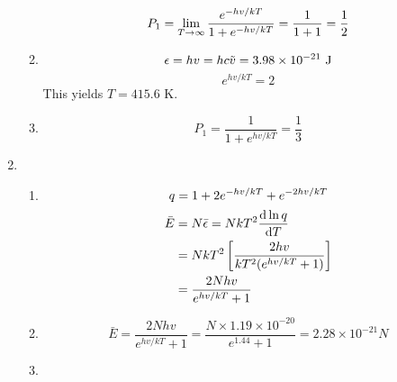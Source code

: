 \begin{solution}
\begin{enumerate}
\begin{enumerate}
                        \begin{equation*}
                            P_1=\lim_{T\to\infty}\frac{e^{-hv/kT}}{1+e^{-hv/kT}}=\frac{1}{1+1}=\frac{1}{2}
                        \end{equation*}
                  \item \begin{equation*}
                            \epsilon=hv=hc\tilde{v}=3.98\times 10^{-21}\text{ J}
                        \end{equation*}
                        \begin{equation*}
                            e^{hv/kT}=2
                        \end{equation*}
                        This yields $T=415.6$ K.
                  \item \begin{equation*}
                            P_1=\frac{1}{1+e^{hv/kT}}=\frac{1}{3}
                        \end{equation*}
              \end{enumerate}
        \item \begin{enumerate}
                  \item \begin{equation*}
                            q=1+2e^{-hv/kT}+e^{-2hv/kT}
                        \end{equation*}
                        \begin{equation*}
                            \begin{aligned}
                                \bar{E} & =N\bar{\epsilon}=NkT^2\frac{\mathrm{d}\ln q}{\mathrm{d} T}     \\
                                        & =NkT^2\left[\frac{2hv}{kT^2(e^{hv/kT}+1)}\right] \\
                                        & =\frac{2Nhv}{e^{hv/kT}+1}
                            \end{aligned}
                        \end{equation*}
                  \item \begin{equation*}
                            \bar{E}=\frac{2Nhv}{e^{hv/kT}+1}=\frac{N\times1.19\times10^{-20}}{e^{1.44}+1}
                            =2.28\times10^{-21}N
                        \end{equation*}
                  \item \begin{equation*}

\end{equation*}
\end{enumerate}
\end{enumerate}
\end{solution}
